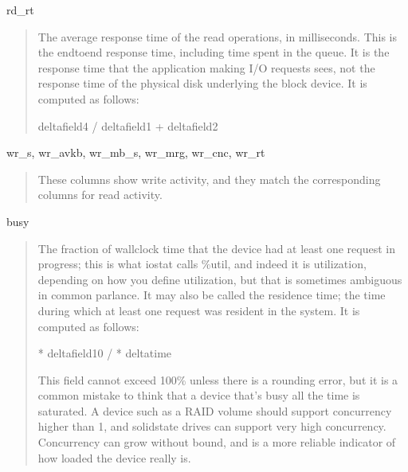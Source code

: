 \documentclass[letterpaper,10pt,english]{sphinxmanual}
\begin{document}
rd\_rt
\begin{quote}

The average response time of the read operations, in milliseconds.  This is the
end\sphinxhyphen{}to\sphinxhyphen{}end response time, including time spent in the queue.  It is the response
time that the application making I/O requests sees, not the response time of the
physical disk underlying the block device.  It is computed as follows:

\begin{sphinxVerbatim}[commandchars=\\\{\}]
delta\PYG{o}{[}field4\PYG{o}{]} / delta\PYG{o}{[}field1\PYG{o}{]} + delta\PYG{o}{[}field2\PYG{o}{]}
\end{sphinxVerbatim}
\end{quote}

wr\_s, wr\_avkb, wr\_mb\_s, wr\_mrg, wr\_cnc, wr\_rt
\begin{quote}

These columns show write activity, and they match the corresponding columns for
read activity.
\end{quote}

busy
\begin{quote}

The fraction of wall\sphinxhyphen{}clock time that the device had at least one request in
progress; this is what iostat calls \%util, and indeed it is utilization,
depending on how you define utilization, but that is sometimes ambiguous in
common parlance.  It may also be called the residence time; the time during
which at least one request was resident in the system.  It is computed as
follows:

\begin{sphinxVerbatim}[commandchars=\\\{\}]
 * delta\PYG{o}{[}field10\PYG{o}{]} /  * delta\PYG{o}{[}time\PYG{o}{]}
\end{sphinxVerbatim}

This field cannot exceed 100\% unless there is a rounding error, but it is a
common mistake to think that a device that’s busy all the time is saturated.  A
device such as a RAID volume should support concurrency higher than 1, and
solid\sphinxhyphen{}state drives can support very high concurrency.  Concurrency can grow
without bound, and is a more reliable indicator of how loaded the device really
is.
\end{quote}
\end{document}

